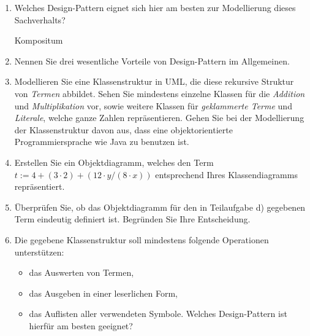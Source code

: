 \documentclass{lehramt-informatik-aufgabe}
\begin{document}
\begin{enumerate}


\item Welches Design-Pattern eignet sich hier am besten zur Modellierung
dieses Sachverhalts?

\begin{liAntwort}
Kompositum
\end{liAntwort}


\item Nennen Sie drei wesentliche Vorteile von Design-Pattern im
Allgemeinen.


\item Modellieren Sie eine Klassenstruktur in UML, die diese rekursive
Struktur von \emph{Termen} abbildet. Sehen Sie mindestens einzelne
Klassen für die \emph{Addition} und \emph{Multiplikation} vor, sowie
weitere Klassen für \emph{geklammerte Terme} und \emph{Literale}, welche
ganze Zahlen repräsentieren. Gehen Sie bei der Modellierung der
Klassenstruktur davon aus, dass eine objektorientierte
Programmiersprache wie Java zu benutzen ist.


\item Erstellen Sie ein Objektdiagramm, welches den Term $t := 4 + (3
\cdot 2) + (12 \cdot y / (8 \cdot x))$ entsprechend Ihres
Klassendiagramms repräsentiert.


\item Überprüfen Sie, ob das Objektdiagramm für den in Teilaufgabe d)
gegebenen Term eindeutig definiert ist. Begründen Sie Ihre Entscheidung.


\item Die gegebene Klassenstruktur soll mindestens folgende Operationen
unterstützen:

\begin{itemize}
\item das Auswerten von Termen,
\item das Ausgeben in einer leserlichen Form,
\item das Auflisten aller verwendeten Symbole.
Welches Design-Pattern ist hierfür am besten geeignet?

\end{itemize}



\end{enumerate}
\end{document}
